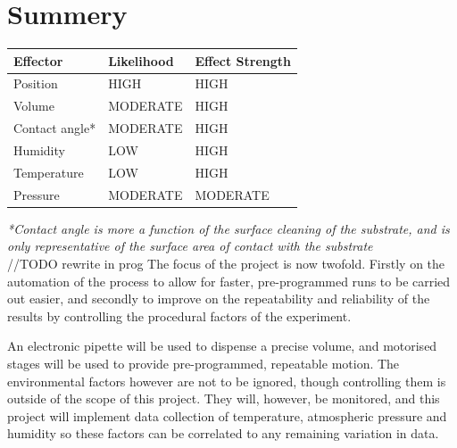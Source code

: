 \section{Summery}
\begin{table}[h]
    \centering
    \begin{tabular}{|l|l|l|}
    \hline
    \textbf{Effector} & \textbf{Likelihood} & \textbf{Effect Strength}\\ \hline
    Position          &HIGH                &HIGH                      \\ \hline
    Volume            &MODERATE            &HIGH                      \\ \hline
    Contact angle*    &MODERATE            &HIGH                          \\ \hline
    Humidity          &LOW                 &HIGH                          \\ \hline
    Temperature       &LOW                 &HIGH                          \\ \hline
    Pressure          &MODERATE            &MODERATE                          \\ \hline
\end{tabular}
\end{table}
\textit{\small{*Contact angle is more a function of the surface cleaning of the substrate, and is only representative of the surface area of contact with the substrate}} \\

//TODO rewrite in prog
The focus of the project is now twofold. Firstly on the automation of the process to allow for faster, pre-programmed runs to be carried out easier, and secondly to improve on the repeatability and reliability of the results by controlling the procedural factors of the experiment. 

An electronic pipette will be used to dispense a precise volume, and motorised stages will be used to provide pre-programmed, repeatable motion. The environmental factors however are not to be ignored, though controlling them is outside of the scope of this project. They will, however, be monitored, and this project will implement data collection of temperature, atmospheric pressure and humidity so these factors can be correlated to any remaining variation in data.